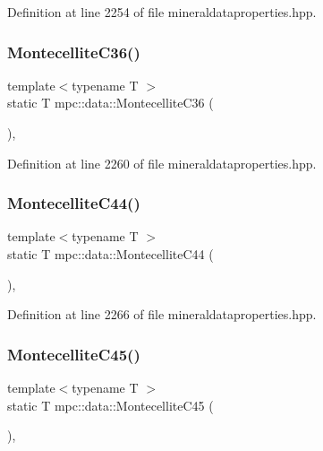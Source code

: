 Definition at line 2254 of file mineraldataproperties.\+hpp.

\mbox{\label{namespacempc_1_1data_af28fd1a2f9a243ce17c471772d894666}} 
\subsubsection{\texorpdfstring{Montecellite\+C36()}{MontecelliteC36()}}
{\footnotesize\ttfamily template$<$typename T $>$ \\
static T mpc\+::data\+::\+Montecellite\+C36 (\begin{DoxyParamCaption}{ }\end{DoxyParamCaption})\hspace{0.3cm}{\ttfamily [inline]}, {\ttfamily [static]}}



Definition at line 2260 of file mineraldataproperties.\+hpp.

\mbox{\label{namespacempc_1_1data_a6180ad0bfa9aac1c838e80856e5d9d7c}} 
\subsubsection{\texorpdfstring{Montecellite\+C44()}{MontecelliteC44()}}
{\footnotesize\ttfamily template$<$typename T $>$ \\
static T mpc\+::data\+::\+Montecellite\+C44 (\begin{DoxyParamCaption}{ }\end{DoxyParamCaption})\hspace{0.3cm}{\ttfamily [inline]}, {\ttfamily [static]}}



Definition at line 2266 of file mineraldataproperties.\+hpp.

\mbox{\label{namespacempc_1_1data_a85ebc44f7e78acc59031f580e60a2a89}} 
\subsubsection{\texorpdfstring{Montecellite\+C45()}{MontecelliteC45()}}
{\footnotesize\ttfamily template$<$typename T $>$ \\
static T mpc\+::data\+::\+Montecellite\+C45 (\begin{DoxyParamCaption}{ }\end{DoxyParamCaption})\hspace{0.3cm}{\ttfamily [inline]}, {\ttfamily [static]}}



